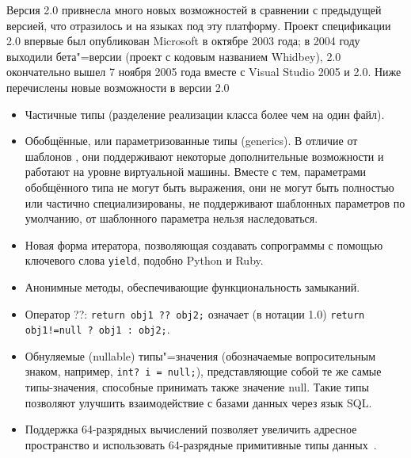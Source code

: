Версия \dotnet{} 2.0 привнесла много новых возможностей в сравнении с предыдущей версией, что отразилось и на языках под эту платформу.
Проект спецификации \csharp{} 2.0 впервые был опубликован Microsoft в октябре 2003 года; в 2004 году выходили бета"=версии (проект с кодовым названием Whidbey), \csharp{} 2.0 окончательно вышел 7 ноября 2005 года вместе с Visual Studio 2005 и \dotnet{} 2.0.
Ниже перечислены новые возможности в версии 2.0
\begin{itemize}
  \item Частичные типы (разделение реализации класса более чем на один файл).

  \item Обобщённые, или параметризованные типы (generics).
  В отличие от шаблонов \cpp{}, они поддерживают некоторые дополнительные возможности и работают на уровне виртуальной машины.
  Вместе с тем, параметрами обобщённого типа не могут быть выражения, они не могут быть полностью или частично специализированы, не поддерживают шаблонных параметров по умолчанию, от шаблонного параметра нельзя наследоваться.

  \item Новая форма итератора, позволяющая создавать сопрограммы с помощью ключевого слова \lstinline[style=csharpinlinestyle]!yield!, подобно Python и Ruby.

  \item Анонимные методы, обеспечивающие функциональность замыканий.

  \item Оператор ??: \lstinline!return obj1 ?? obj2;! означает (в нотации \csharp{} 1.0) \lstinline[style=csharpinlinestyle]/return obj1!=null ? obj1 : obj2;/.

  \item Обнуляемые (nullable) типы"=значения (обозначаемые вопросительным знаком, например, \lstinline[style=csharpinlinestyle]!int? i = null;!), представляющие собой те же самые типы-значения, способные принимать также значение null.
  Такие типы позволяют улучшить взаимодействие с базами данных через язык SQL.

  \item Поддержка 64-разрядных вычислений позволяет увеличить адресное пространство и использовать 64-разрядные примитивные типы данных~\cite{csharp_wiki_2013_ru}.
\end{itemize}

